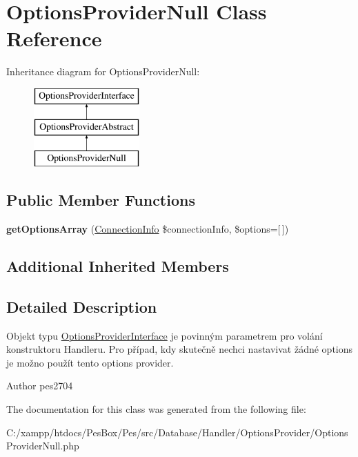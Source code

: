 \hypertarget{class_pes_1_1_database_1_1_handler_1_1_options_provider_1_1_options_provider_null}{}\section{Options\+Provider\+Null Class Reference}
\label{class_pes_1_1_database_1_1_handler_1_1_options_provider_1_1_options_provider_null}
Inheritance diagram for Options\+Provider\+Null\+:\begin{figure}[H]
\begin{center}
\leavevmode
\includegraphics[height=3.000000cm]{class_pes_1_1_database_1_1_handler_1_1_options_provider_1_1_options_provider_null}
\end{center}
\end{figure}
\subsection*{Public Member Functions}
\begin{DoxyCompactItemize}
\item 
\mbox{\label{class_pes_1_1_database_1_1_handler_1_1_options_provider_1_1_options_provider_null_a413d3f400d248b03b5b4e9a67134dd47}} 
{\bfseries get\+Options\+Array} (\mbox{\hyperlink{class_pes_1_1_database_1_1_handler_1_1_connection_info}{Connection\+Info}} \$connection\+Info, \$options=\mbox{[}$\,$\mbox{]})
\end{DoxyCompactItemize}
\subsection*{Additional Inherited Members}


\subsection{Detailed Description}
Objekt typu \mbox{\hyperlink{interface_pes_1_1_database_1_1_handler_1_1_options_provider_1_1_options_provider_interface}{Options\+Provider\+Interface}} je povinným parametrem pro volání konstruktoru Handleru. Pro případ, kdy skutečně nechci nastavivat žádné options je možno použít tento options provider.

\begin{DoxyAuthor}{Author}
pes2704 
\end{DoxyAuthor}


The documentation for this class was generated from the following file\+:\begin{DoxyCompactItemize}
\item 
C\+:/xampp/htdocs/\+Pes\+Box/\+Pes/src/\+Database/\+Handler/\+Options\+Provider/Options\+Provider\+Null.\+php\end{DoxyCompactItemize}
